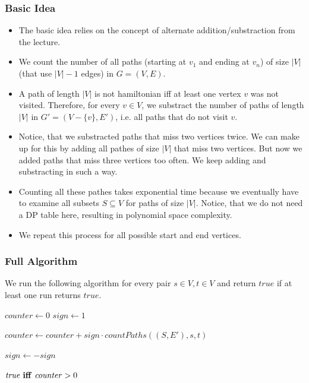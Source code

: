 \documentclass[12pt]{article}
\begin{document}
\subsubsection*{Basic Idea}
\begin{itemize}
	\item The basic idea relies on the concept of alternate addition/substraction from the lecture.
	\item We count the number of all paths (starting at $v_1$ and ending at $v_n$) of size $|V|$ (that use $|V| - 1$ edges) in $G=(V,E)$.
	\item A path of length $|V|$ is not hamiltonian iff at least one vertex $v$ was not visited. Therefore, for every $v \in V$, we substract the number of paths of length $|V|$ in $G'=(V-\{v\}, E')$, i.e. all paths that do not visit $v$.
	\item Notice, that we substracted paths that miss two vertices twice. We can make up for this by adding all pathes of size $|V|$ that miss two vertices. But now we added paths that miss three vertices too often. We keep adding and substracting in such a way.
	\item Counting all these pathes takes exponential time because we eventually have to examine all subsets $S \subseteq V$ for paths of size $|V|$. Notice, that we do not need a DP table here, resulting in polynomial space complexity.
	\item We repeat this process for all possible start and end vertices.
\end{itemize}

\subsubsection*{Full Algorithm}
We run the following algorithm for every pair $s \in V, t \in V$ and return $\mathit{true}$ if at least one run returns $\mathit{true}$.

\begin{algorithmic}
	\State $\mathit{counter} \gets 0$
	\State $\mathit{sign} \gets 1$

			\State $\mathit{counter} \gets \mathit{counter} + \mathit{sign} \cdot \mathit{countPaths}((S, E'), s, t)$
		\EndFor

		\State $\mathit{sign} \gets -\mathit{sign}$
	\EndFor
	
	\Return $\mathit{true} \mbox{ \textbf{iff} } \mathit{counter} > 0$
\end{algorithmic}
\end{document}
